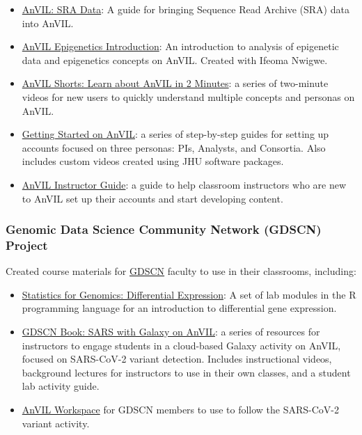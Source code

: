 \documentclass{cv}
\begin{document}
\begin{itemize}

\item \href{https://hutchdatascience.org/AnVIL_SRA_Data/}{AnVIL: SRA Data}: A guide for bringing Sequence Read Archive (SRA) data into AnVIL.

\item \href{https://hutchdatascience.org/AnVIL_Book_Epigenetics_Intro/}{AnVIL Epigenetics Introduction}: An introduction to analysis of epigenetic data and epigenetics concepts on AnVIL. Created with Ifeoma Nwigwe.

\item \href{https://www.youtube.com/watch?v=tVh93e6TzCE\&list=PL6aYJ_0zJ4uCABkMngSYjPo_3c-nUUmio}{AnVIL Shorts: Learn about AnVIL in 2 Minutes}: a series of two-minute videos for new users to quickly understand multiple concepts and personas on AnVIL.

\item \href{https://jhudatascience.org/AnVIL_Book_Getting_Started/}{Getting Started on AnVIL}: a series of step-by-step guides for setting up accounts focused on three personas: PIs, Analysts, and Consortia. Also includes custom videos created using JHU software packages.

\item \href{https://jhudatascience.org/AnVIL_Book_Instructor_Guide/}{AnVIL Instructor Guide}: a guide to help classroom instructors who are new to AnVIL set up their accounts and start developing content.

\end{itemize}

\subsubsection*{Genomic Data Science Community Network (GDSCN) Project}

Created course materials for \href{https://www.gdscn.org/}{GDSCN} faculty to use in their classrooms, including: 

\begin{itemize}

\item \href{https://jhudatascience.org/GDSCN_Book_Statistics_for_Genomics_Differential_Expression/}{Statistics for Genomics: Differential Expression}: A set of lab modules in the R programming language for an introduction to differential gene expression.

\item \href{https://jhudatascience.org/GDSCN_Book_SARS_Galaxy_on_AnVIL/}{GDSCN Book: SARS with Galaxy on AnVIL}: a series of resources for instructors to engage students in a cloud-based Galaxy activity on AnVIL, focused on SARS-CoV-2 variant detection. Includes instructional videos, background lectures for instructors to use in their own classes, and a student lab activity guide.

\item \href{https://anvil.terra.bio/#workspaces/gdscn-exercises/SARS-CoV-2-Genome}{AnVIL Workspace} for GDSCN members to use to follow the SARS-CoV-2 variant activity.

\end{itemize}
\end{document}
